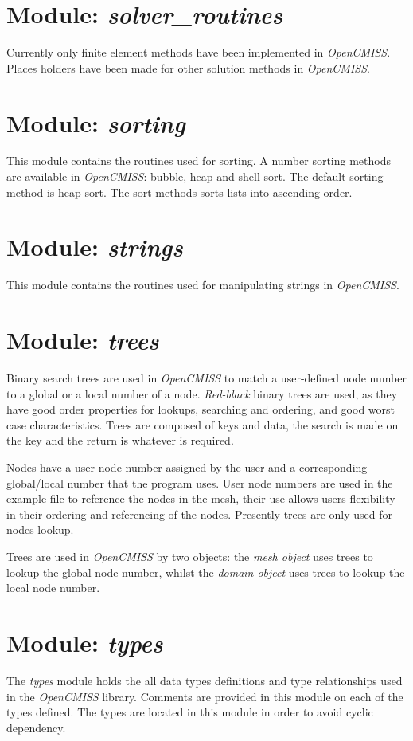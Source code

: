 \section{Module: \emph{solver\_routines}}
\label{sec:solverroutines}

Currently only finite element methods have been implemented in \emph{OpenCMISS}. 
Places holders have been made for other solution methods in \emph{OpenCMISS}.


\section{Module: \emph{sorting}}
\label{sec:sorting}

This module contains the routines used for sorting. A number sorting methods 
are available in \emph{OpenCMISS}: bubble, heap and shell sort. The default 
sorting method is heap sort. The sort methods sorts lists into ascending order. 


\section{Module: \emph{strings}}
\label{sec:strings}

This module contains the routines used for manipulating strings in 
\emph{OpenCMISS}.


\section{Module: \emph{trees}}
\label{sec:trees}

Binary search trees are used in \emph{OpenCMISS} to match a user-defined node 
number to a global or a local number of a node. \emph{Red-black} binary trees 
are used, as they have good order properties for lookups, searching and 
ordering, and good worst case characteristics. Trees are composed of keys and 
data, the search is made on the key and the return is whatever is required.

Nodes have a user node number assigned by the user and a corresponding 
global/local number that the program uses. User node numbers are used in the 
example file to reference the nodes in the mesh, their use allows users 
flexibility in their ordering and referencing of the nodes. Presently trees 
are only used for nodes lookup.

Trees are used in \emph{OpenCMISS} by two objects: the \emph{mesh object} uses 
trees to lookup the global node number, whilst the \emph{domain object} uses
trees to lookup the local node number.


\section{Module: \emph{types}}
\label{sec:types}

The \emph{types} module holds the all data types definitions and type
relationships used in the \emph{OpenCMISS} library. Comments are provided 
in this module on each of the types defined. The types are located in this 
module in order to avoid cyclic dependency. 
